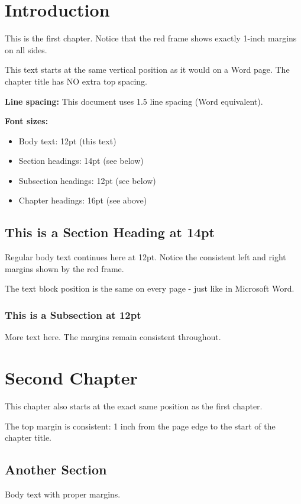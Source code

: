 \documentclass[12pt,oneside,a4paper]{report}
\begin{document}
\chapter{Introduction}
This is the first chapter. Notice that the red frame shows exactly 1-inch margins on all sides.

This text starts at the same vertical position as it would on a Word page. The chapter title has NO extra top spacing.

\textbf{Line spacing:} This document uses 1.5 line spacing (Word equivalent).

\textbf{Font sizes:}
\begin{itemize}
\item Body text: 12pt (this text)
\item Section headings: 14pt (see below)
\item Subsection headings: 12pt (see below)
\item Chapter headings: 16pt (see above)
\end{itemize}

\section{This is a Section Heading at 14pt}
Regular body text continues here at 12pt. Notice the consistent left and right margins shown by the red frame.

The text block position is the same on every page - just like in Microsoft Word.

\subsection{This is a Subsection at 12pt}
More text here. The margins remain consistent throughout.

\newpage

\chapter{Second Chapter}
This chapter also starts at the exact same position as the first chapter.

The top margin is consistent: 1 inch from the page edge to the start of the chapter title.

\section{Another Section}
Body text with proper margins.
\end{document}
